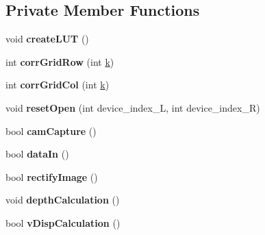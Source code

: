 \subsection*{Private Member Functions}
\begin{DoxyCompactItemize}
\item 
\hypertarget{classstereo__vision_af59672af6aac7231b711998a881a6207}{}void {\bfseries create\+L\+U\+T} ()\label{classstereo__vision_af59672af6aac7231b711998a881a6207}

\item 
\hypertarget{classstereo__vision_a9ba04ac316db4e0eafc80916309374d4}{}int {\bfseries corr\+Grid\+Row} (int \hyperlink{class_top_view_a1f2b530e7979db621630dbbf9f5def15}{k})\label{classstereo__vision_a9ba04ac316db4e0eafc80916309374d4}

\item 
\hypertarget{classstereo__vision_a1921e6d848a96c9989a0a86b4ef9fd82}{}int {\bfseries corr\+Grid\+Col} (int \hyperlink{class_top_view_a1f2b530e7979db621630dbbf9f5def15}{k})\label{classstereo__vision_a1921e6d848a96c9989a0a86b4ef9fd82}

\item 
\hypertarget{classstereo__vision_ad8a2dff52e5b5dc21eab2203dbb17d3a}{}void {\bfseries reset\+Open} (int device\+\_\+index\+\_\+\+L, int device\+\_\+index\+\_\+\+R)\label{classstereo__vision_ad8a2dff52e5b5dc21eab2203dbb17d3a}

\item 
\hypertarget{classstereo__vision_a107d39b128afb19544c842bb960dfcc1}{}bool {\bfseries cam\+Capture} ()\label{classstereo__vision_a107d39b128afb19544c842bb960dfcc1}

\item 
\hypertarget{classstereo__vision_a85ad1d14a5813f89e5b2ba48a4951cc1}{}bool {\bfseries data\+In} ()\label{classstereo__vision_a85ad1d14a5813f89e5b2ba48a4951cc1}

\item 
\hypertarget{classstereo__vision_a438714bfc63e25fa55509422d10909a4}{}bool {\bfseries rectify\+Image} ()\label{classstereo__vision_a438714bfc63e25fa55509422d10909a4}

\item 
\hypertarget{classstereo__vision_aac941ae2043d7e1034d002033e6cf3d0}{}void {\bfseries depth\+Calculation} ()\label{classstereo__vision_aac941ae2043d7e1034d002033e6cf3d0}

\item 
\hypertarget{classstereo__vision_aa8e6fc4e5d1a8447baa53a64ba4d2a9f}{}bool {\bfseries v\+Disp\+Calculation} ()\label{classstereo__vision_aa8e6fc4e5d1a8447baa53a64ba4d2a9f}


\end{DoxyCompactItemize}
